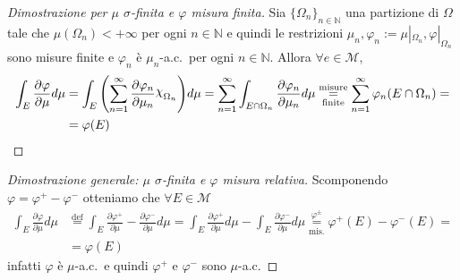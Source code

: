 \begin{proof}[Dimostrazione per \(\mu\) \(\sigma\)-finita e \(\varphi \) misura
finita] Sia \({\{\Omega_{n}\}}_{n \in \mathbb{N}}\) una partizione di
    \(\Omega\) tale che \(\mu(\Omega_{n}) < +\infty\) per ogni \(n \in
    \mathbb{N}\) e quindi le restrizioni \(\mu_{n}, \varphi_n :=
    \mu|_{\Omega_{n}}, \varphi|_{\Omega_{n}}  \) sono misure finite e
    \(\varphi_n\) è \(\mu_{n}\)-a.c.~per ogni \(n \in \mathbb{N}\). Allora
    \(\forall e \in \mathcal{M}\),
    \begin{align*}
        \int_E \frac{\partial \varphi }{\partial \mu} d\mu &=
        \int_{E} {\left( \sum_{n=1}^{\infty} \frac{\partial \varphi_n}{\partial
        \mu_{n}}\rchi_{\Omega_{n}}   \right)} d\mu = \sum_{n=1}^{\infty} \int_{E
    \cap \Omega_{n}} \frac{\partial \varphi_n}{\partial \mu_{n}} d\mu
    \underset{\text{finite}}{\overset{\text{misure}}{=}} \sum_{n=1}^{\infty}
    \varphi_n(E \cap \Omega_{n}) = \\ &= \varphi(E)
    \end{align*}
\end{proof}
\begin{proof}[Dimostrazione generale: \(\mu\) \(\sigma\)-finita e \(\varphi\)
    misura relativa] Scomponendo \(\varphi = \varphi^{+} - \varphi^{-}\)
    otteniamo che \(\forall E \in \mathcal{M}\) 
    \begin{align*}
        \int_E \frac{\partial \varphi }{\partial \mu}d\mu
        &\overset{\text{def}}{=} \int_E \frac{\partial \varphi ^{+}}{\partial
        \mu} - \frac{\partial \varphi ^{-}}{\partial \mu} d\mu = \int_E
        \frac{\partial \varphi ^{+}}{\partial \mu} d\mu - \int_E \frac{\partial
            \varphi ^{-}}{\partial \mu} d\mu
            \underset{\text{mis.}}{\overset{\varphi^{\pm}}{=}} \varphi ^{+}(E)
            - \varphi ^{-}(E) =  \\ &=\varphi(E)
    \end{align*}
    infatti \(\varphi\) è \(\mu\)-a.c.~e quindi \(\varphi^{+}\) e
    \(\varphi^{-}\) sono \(\mu\)-a.c.
\end{proof}


